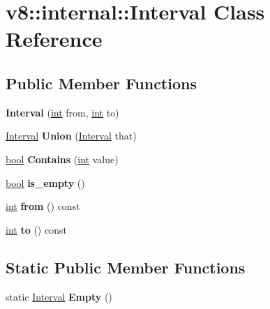 \hypertarget{classv8_1_1internal_1_1Interval}{}\section{v8\+:\+:internal\+:\+:Interval Class Reference}
\label{classv8_1_1internal_1_1Interval}
\subsection*{Public Member Functions}
\begin{DoxyCompactItemize}
\item 
\mbox{\label{classv8_1_1internal_1_1Interval_a1dd35e0358bb18930823d546ad01ac30}} 
{\bfseries Interval} (\mbox{\hyperlink{classint}{int}} from, \mbox{\hyperlink{classint}{int}} to)
\item 
\mbox{\label{classv8_1_1internal_1_1Interval_a8178f50f9964a63a34c2ac53c3732426}} 
\mbox{\hyperlink{classv8_1_1internal_1_1Interval}{Interval}} {\bfseries Union} (\mbox{\hyperlink{classv8_1_1internal_1_1Interval}{Interval}} that)
\item 
\mbox{\label{classv8_1_1internal_1_1Interval_ada3527bcada1af9754fbff580738ae20}} 
\mbox{\hyperlink{classbool}{bool}} {\bfseries Contains} (\mbox{\hyperlink{classint}{int}} value)
\item 
\mbox{\label{classv8_1_1internal_1_1Interval_ad0a7a8fff4666d6de2e2989115752582}} 
\mbox{\hyperlink{classbool}{bool}} {\bfseries is\+\_\+empty} ()
\item 
\mbox{\label{classv8_1_1internal_1_1Interval_a7ff2b7449da4107e731009e92021735c}} 
\mbox{\hyperlink{classint}{int}} {\bfseries from} () const
\item 
\mbox{\label{classv8_1_1internal_1_1Interval_acdee869144f300436d5a79d1490cadcf}} 
\mbox{\hyperlink{classint}{int}} {\bfseries to} () const
\end{DoxyCompactItemize}
\subsection*{Static Public Member Functions}
\begin{DoxyCompactItemize}
\item 
\mbox{\label{classv8_1_1internal_1_1Interval_a6131d294464930b38182ae30ac0e7bdf}} 
static \mbox{\hyperlink{classv8_1_1internal_1_1Interval}{Interval}} {\bfseries Empty} ()
\end{DoxyCompactItemize}
